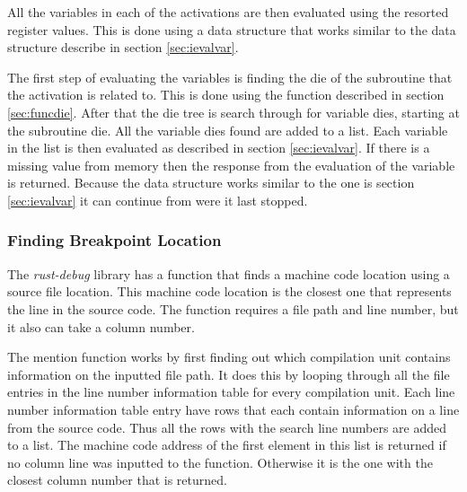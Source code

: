 All the variables in each of the activations are then evaluated using the resorted register values.
This is done using a data structure that works similar to the data structure describe in section \ref{sec:ievalvar}.

The first step of evaluating the variables is finding the \gls{die} of the subroutine that the activation is related to.
This is done using the function described in section \ref{sec:funcdie}.
After that the \gls{die} tree is search through for variable \glspl{die}, starting at the subroutine \gls{die}.
All the variable \glspl{die} found are added to a list.
Each variable in the list is then evaluated as described in section \ref{sec:ievalvar}.
If there is a missing value from memory then the response from the evaluation of the variable is returned.
Because the data structure works similar to the one is section \ref{sec:ievalvar} it can continue from were it last stopped.


\subsubsection{Finding Breakpoint Location}
The \emph{rust-debug} library has a function that finds a machine code location using a source file location.
This machine code location is the closest one that represents the line in the source code.
The function requires a file path and line number, but it also can take a column number.


The mention function works by first finding out which compilation unit contains information on the inputted file path.
It does this by looping through all the file entries in the line number information table for every compilation unit.
Each line number information table entry have rows that each contain information on a line from the source code.
Thus all the rows with the search line numbers are added to a list.
The machine code address of the first element in this list is returned if no column line was inputted to the function.
Otherwise it is the one with the closest column number that is returned.

